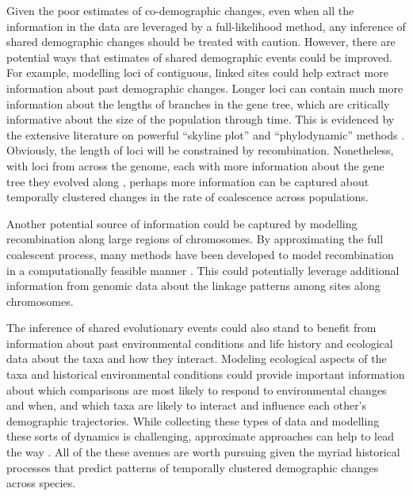 Given the poor estimates of co-demographic changes, even when all the
information in the data are leveraged by a full-likelihood method, any
inference of shared demographic changes should be treated with caution.
However, there are potential ways that estimates of shared demographic
events could be improved.
For example, modelling loci of contiguous, linked sites could help
extract more information about past demographic changes.
Longer loci can contain much more information about the lengths of branches in
the gene tree, which are critically informative about the size of the
population through time.
This is evidenced by the extensive literature on powerful 
``skyline plot'' and ``phylodynamic'' methods
\citep{Pybus2000,Strimmer2001,OpgenRhein2005,Drummond2005,Heled2008,Minin2008beast,Ho2011,Palacios2012,Palacios2012UAI,Stadler2013,Gill2013,Palacios2014,Lan2015,Karcher2016,Karcher2017,Faulkner2018,Karcher2019}.
Obviously, the length of loci will be constrained by recombination.
Nonetheless, with loci from across the genome, each with more information about
the gene tree they evolved along \citep{Speidel2019},
perhaps more information can be captured about temporally clustered changes in
the rate of coalescence across populations.

Another potential source of information could be captured by modelling
recombination along large regions of chromosomes.
By approximating the full coalescent process, many methods have been developed
to model recombination in a computationally feasible manner
\citep{McVean2005,Marjoram2006,Chen2009,Li2011,Sheehan2013,Schiffels2014,Rasmussen2014,Palacios2015}.
This could potentially leverage additional information from genomic data about the
linkage patterns among sites along chromosomes.

The inference of shared evolutionary events could also stand to benefit from
information about past environmental conditions and life history and ecological
data about the taxa and how they interact.
Modeling ecological aspects of the taxa and historical environmental conditions
could provide important information about which comparisons are most likely to
respond to environmental changes and when, and which taxa are likely to
interact and influence each other's demographic trajectories.
While collecting these types of data and modelling these sorts of dynamics
is challenging, approximate approaches can help to lead the way
\citep{He2013,Massatti2016,Bemmels2016,Knowles2017,Papadopoulou2016}.
All of the these avenues are worth pursuing given the myriad historical
processes that predict patterns of temporally clustered demographic changes
across species.
